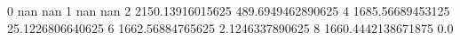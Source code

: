 0 nan nan
1 nan nan
2 2150.13916015625 489.6949462890625
4 1685.56689453125 25.1226806640625
6 1662.56884765625 2.1246337890625
8 1660.4442138671875 0.0

